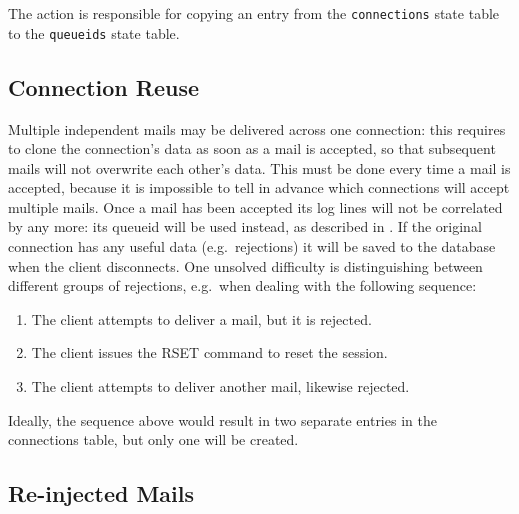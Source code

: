 The  action is responsible for copying an entry from the
\texttt{connections} state table to the \texttt{queueids} state table.

\subsection{Connection Reuse}

\label{connection reuse}

Multiple independent mails may be delivered across one connection: this
requires \parsername{} to clone the connection's data as soon as a mail is
accepted, so that subsequent mails will not overwrite each other's data.
This must be done every time a mail is accepted, because it is impossible
to tell in advance which connections will accept multiple mails.  Once a
mail has been accepted its log lines will not be correlated by
 any more: its queueid will be used instead, as described in
.  If the original connection has any useful
data (e.g.\ rejections) it will be saved to the database when the client
disconnects.  One unsolved difficulty is distinguishing between different
groups of rejections, e.g.\ when dealing with the following sequence:

\begin{enumerate}

    \squeezeitems{}

    \item The client attempts to deliver a mail, but it is rejected.

    \item The client issues the RSET command to reset the 
        session.

    \item The client attempts to deliver another mail, likewise rejected.

\end{enumerate}

Ideally, the sequence above would result in two separate entries in the
connections table, but only one will be created.



\subsection{Re-injected Mails}

\label{Re-injected mails}

\label{tracking re-injected mail}

